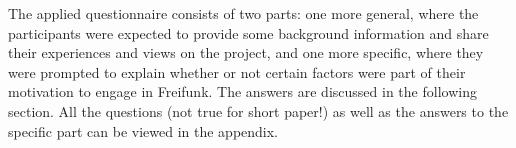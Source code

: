 The applied questionnaire consists of two parts: one more general, where the participants were expected to provide some background information and share their experiences and views on the project, and one more specific, where they were prompted to explain whether or not certain factors were part of their motivation to engage in Freifunk.
The answers are discussed in the following section.
All the questions (not true for short paper!) as well as the answers to the specific part can be viewed in the appendix.


\begin{comment}
\begin{itemize}
  \item literature review for FOSS <-- only as comparison
  \item semi-structured interviews for Freifunk <-- focus
    \begin{itemize}
      \item limitations of the methodology
    \end{itemize}
\end{itemize}
\end{comment}
